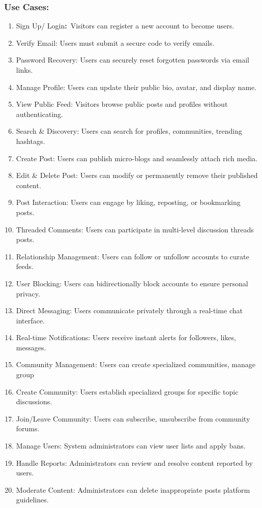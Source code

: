 \subsubsection{Use Cases:}
\begin{enumerate}
  \item Sign Up/ Login\textbf{:}~Visitors can register a new account to become users.
  \item Verify Email: Users must submit a secure code to verify emails.
  \item Password Recovery: Users can securely reset forgotten passwords via email links.
  \item Manage Profile: Users can update their public bio, avatar, and display name.
  \item View Public Feed: Visitors browse public posts and profiles without authenticating.
  \item Search \& Discovery: Users can search for profiles, communities, trending hashtags.
  \item Create Post: Users can publish micro-blogs and seamlessly attach rich media.
  \item Edit \& Delete Post: Users can modify or permanently remove their published content.
  \item Post Interaction: Users can engage by liking, reposting, or bookmarking posts.
  \item Threaded Comments: Users can participate in multi-level discussion threads posts.
  \item Relationship Management: Users can follow or unfollow accounts to curate feeds.
  \item User Blocking: Users can bidirectionally block accounts to ensure personal privacy.
  \item Direct Messaging: Users communicate privately through a real-time chat interface.
  \item Real-time Notifications: Users receive instant alerts for followers, likes, messages.
  \item Community Management: Users can create specialized communities, manage group
  \item Create Community: Users establish specialized groups for specific topic discussions.
  \item Join/Leave Community: Users can subscribe, unsubscribe from community forums.
  \item Manage Users: System administrators can view user lists and apply bans.
  \item Handle Reports: Administrators can review and resolve content reported by users.
  \item Moderate Content: Administrators can delete inappropriate posts platform guidelines.
\end{enumerate}

